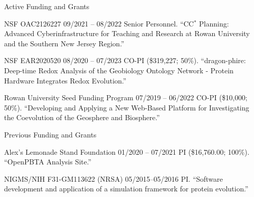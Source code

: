 \documentclass{resume} %
\begin{document}
\vspace*{0.35cm}
\begin{rSection}{Active Funding and Grants}
\vspace*{0.25cm}

\begin{rSubsection}
  {NSF OAC2126227}
  {09/2021 -- 08/2022}
  {Senior Personnel. ``CC$^\ast$ Planning: Advanced Cyberinfrastructure for Teaching and Research at Rowan University and the Southern New Jersey Region.''}
\end{rSubsection}


\begin{rSubsection}
  {NSF EAR2020520}
  {08/2020 -- 07/2023}
  {CO-PI (\$319,227; 50\%). ``dragon-phire: Deep-time Redox Analysis of the Geobiology Ontology Network - Protein Hardware Integrates Redox Evolution.''}
\end{rSubsection}

\begin{rSubsection}
  {Rowan University Seed Funding Program}
  {07/2019 -- 06/2022}
  {CO-PI (\$10,000; 50\%). ``Developing and Applying a New Web-Based Platform for Investigating the Coevolution of the Geosphere and Biosphere.''}
\end{rSubsection}









\vspace*{0.35cm}
\begin{rSection}{Previous Funding and Grants}
\vspace*{0.25cm}

\begin{rSubsection}
  {Alex's Lemonade Stand Foundation}
  {01/2020 -- 07/2021}
  {PI (\$16,760.00; 100\%). ``OpenPBTA Analysis Site.''}
\end{rSubsection}



\begin{rSubsection}
  {NIGMS/NIH F31-GM113622 (NRSA)}
  {05/2015--05/2016}
  {PI. ``Software development and application of a simulation framework for protein evolution.''}
\end{rSubsection}


\end{rSection}
\end{rSection}
\end{document}
